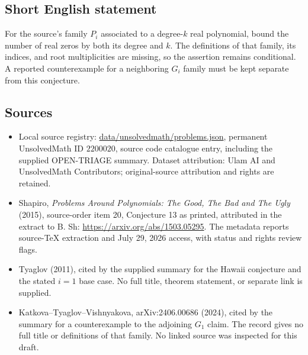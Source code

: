 \documentclass[11pt]{article}
\begin{document}
\subsection{Short English statement}
For the source's family $P_i$ associated to a degree-$k$ real polynomial, bound the number of real zeros by both its degree and $k$. The definitions of that family, its indices, and root multiplicities are missing, so the assertion remains conditional. A reported counterexample for a neighboring $G_i$ family must be kept separate from this conjecture.
\subsection{Sources}
\begin{itemize}
\item Local source registry: \url{data/unsolvedmath/problems.json}, permanent UnsolvedMath ID $2200020$, source code catalogue entry, including the supplied OPEN-TRIAGE summary. Dataset attribution: Ulam AI and UnsolvedMath Contributors; original-source attribution and rights are retained.
\item Shapiro, \emph{Problems Around Polynomials: The Good, The Bad and The Ugly} (2015), source-order item 20, Conjecture 13 as printed, attributed in the extract to B. Sh: \url{https://arxiv.org/abs/1503.05295}. The metadata reports source-TeX extraction and July 29, 2026 access, with status and rights review flags.
\item Tyaglov (2011), cited by the supplied summary for the Hawaii conjecture and the stated $i=1$ base case. No full title, theorem statement, or separate link is supplied.
\item Katkova--Tyaglov--Vishnyakova, arXiv:2406.00686 (2024), cited by the summary for a counterexample to the adjoining $G_1$ claim. The record gives no full title or definitions of that family. No linked source was inspected for this draft.
\end{itemize}
\end{document}
